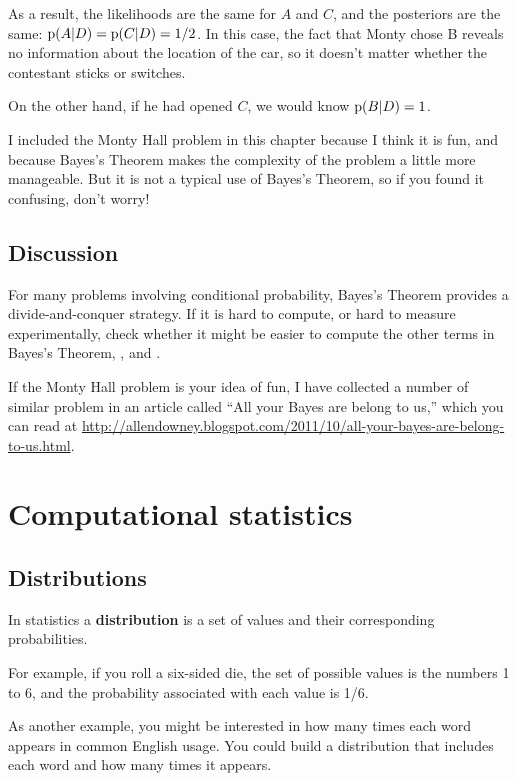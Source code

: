 \documentclass[12pt]{book}
\begin{document}
As a result, the likelihoods are the same for $A$ and $C$, and the
posteriors are the same: $\mathrm{p}(A|D) = \mathrm{p}(C|D) = 1/2$.  In this case, the
fact that Monty chose B reveals no information about the location of
the car, so it doesn't matter whether the contestant sticks or
switches.

On the other hand, if he had opened $C$, we would know $\mathrm{p}(B|D) = 1$.

I included the Monty Hall problem in this chapter because I think it
is fun, and because Bayes's Theorem makes the complexity of the
problem a little more manageable.  But it is not a typical use of
Bayes's Theorem, so if you found it confusing, don't worry!

\section{Discussion}

For many problems involving conditional probability, Bayes's Theorem
provides a divide-and-conquer strategy.  If  it is hard to
compute, or hard to measure experimentally, check whether it might be
easier to compute the other terms in Bayes's Theorem, , 
and .

If the Monty Hall problem is your idea of fun, I have collected a
number of similar problem in an article called ``All your Bayes are
belong to us,'' which you can read at
\url{http://allendowney.blogspot.com/2011/10/all-your-bayes-are-belong-to-us.html}.


\chapter{Computational statistics}

\section{Distributions}

In statistics a {\bf distribution} is a set of values and their
corresponding probabilities.

For example, if you roll a six-sided die, the set of possible
values is the numbers 1 to 6, and the probability associated
with each value is 1/6.

As another example, you might be interested in how many times each
word appears in common English usage.  You could build a distribution
that includes each word and how many times it appears.
\end{document}
